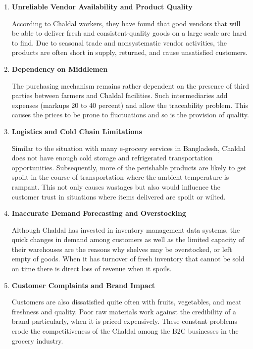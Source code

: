 \documentclass[12pt,a4paper]{article}
\begin{document}
\begin{enumerate}
    \item \textbf{Unreliable Vendor Availability and Product Quality}
    
    According to Chaldal workers, they have found that good vendors that will be able to deliver fresh and consistent-quality goods on a large scale are hard to find. Due to seasonal trade and nonsystematic vendor activities, the products are often short in supply, returned, and cause unsatisfied customers.
    
    \item \textbf{Dependency on Middlemen}
    
    The purchasing mechanism remains rather dependent on the presence of third parties between farmers and Chaldal facilities. Such intermediaries add expenses (markups 20 to 40 percent) and allow the traceability problem. This causes the prices to be prone to fluctuations and so is the provision of quality.
    
    \item \textbf{Logistics and Cold Chain Limitations}
    
    Similar to the situation with many e-grocery services in Bangladesh, Chaldal does not have enough cold storage and refrigerated transportation opportunities. Subsequently, more of the perishable products are likely to get spoilt in the course of transportation where the ambient temperature is rampant. This not only causes wastages but also would influence the customer trust in situations where items delivered are spoilt or wilted.
    
    \item \textbf{Inaccurate Demand Forecasting and Overstocking}
    
    Although Chaldal has invested in inventory management data systems, the quick changes in demand among customers as well as the limited capacity of their warehouses are the reasons why shelves may be overstocked, or left empty of goods. When it has turnover of fresh inventory that cannot be sold on time there is direct loss of revenue when it spoils.
    
    \item \textbf{Customer Complaints and Brand Impact}
    
    Customers are also dissatisfied quite often with fruits, vegetables, and meat freshness and quality. Poor raw materials work against the credibility of a brand particularly, when it is priced expensively. These constant problems erode the competitiveness of the Chaldal among the B2C businesses in the grocery industry.
\end{enumerate}
\end{document}
